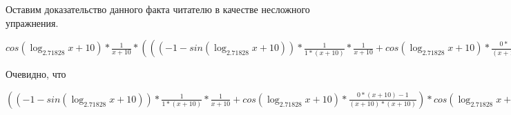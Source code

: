 \documentclass[12pt,a4paper,fleqn]{article}
\theoremstyle{definition}
\begin{document}
Оставим доказательство данного факта читателю в качестве несложного упражнения. 

$cos(\log_{ 2.71828 }{ x  +  10 }) * \frac{ 1 }{ x  +  10 }
 * ((( -1  - sin(\log_{ 2.71828 }{ x  +  10 })) * \frac{ 1 }{ 1  * ( x  +  10 )}
 * \frac{ 1 }{ x  +  10 }
 + cos(\log_{ 2.71828 }{ x  +  10 }) * \frac{ 0  * ( x  +  10 ) -  1 }{( x  +  10 ) * ( x  +  10 )}
) * { 3 }^{sin(\log_{ 2.71828 }{ x  +  10 })} + cos(\log_{ 2.71828 }{ x  +  10 }) * \frac{ 1 }{ x  +  10 }
 *  1  * cos(\log_{ 2.71828 }{ x  +  10 }) * \frac{ 1 }{ 1  * ( x  +  10 )}
 * { 3 }^{sin(\log_{ 2.71828 }{ x  +  10 })}) = cos(\log_{ 2.71828 }{ x  +  10 }) * \frac{ 1 }{ x  +  10 }
 * ((( -1  - sin(\log_{ 2.71828 }{ x  +  10 })) * \frac{ 1 }{ 1  * ( x  +  10 )}
 * \frac{ 1 }{ x  +  10 }
 + cos(\log_{ 2.71828 }{ x  +  10 }) * \frac{ 0  * ( x  +  10 ) -  1 }{( x  +  10 ) * ( x  +  10 )}
) * { 3 }^{sin(\log_{ 2.71828 }{ x  +  10 })} + cos(\log_{ 2.71828 }{ x  +  10 }) * \frac{ 1 }{ x  +  10 }
 *  1  * cos(\log_{ 2.71828 }{ x  +  10 }) * \frac{ 1 }{ 1  * ( x  +  10 )}
 * { 3 }^{sin(\log_{ 2.71828 }{ x  +  10 })})$

Очевидно, что 

$(( -1  - sin(\log_{ 2.71828 }{ x  +  10 })) * \frac{ 1 }{ 1  * ( x  +  10 )}
 * \frac{ 1 }{ x  +  10 }
 + cos(\log_{ 2.71828 }{ x  +  10 }) * \frac{ 0  * ( x  +  10 ) -  1 }{( x  +  10 ) * ( x  +  10 )}
) * cos(\log_{ 2.71828 }{ x  +  10 }) * \frac{ 1 }{ x  +  10 }
 * { 3 }^{sin(\log_{ 2.71828 }{ x  +  10 })} + cos(\log_{ 2.71828 }{ x  +  10 }) * \frac{ 1 }{ x  +  10 }
 * ((( -1  - sin(\log_{ 2.71828 }{ x  +  10 })) * \frac{ 1 }{ 1  * ( x  +  10 )}
 * \frac{ 1 }{ x  +  10 }
 + cos(\log_{ 2.71828 }{ x  +  10 }) * \frac{ 0  * ( x  +  10 ) -  1 }{( x  +  10 ) * ( x  +  10 )}
) * { 3 }^{sin(\log_{ 2.71828 }{ x  +  10 })} + cos(\log_{ 2.71828 }{ x  +  10 }) * \frac{ 1 }{ x  +  10 }
 *  1  * cos(\log_{ 2.71828 }{ x  +  10 }) * \frac{ 1 }{ 1  * ( x  +  10 )}
 * { 3 }^{sin(\log_{ 2.71828 }{ x  +  10 })}) = (( -1  - sin(\log_{ 2.71828 }{ x  +  10 })) * \frac{ 1 }{ 1  * ( x  +  10 )}
 * \frac{ 1 }{ x  +  10 }
 + cos(\log_{ 2.71828 }{ x  +  10 }) * \frac{ 0  * ( x  +  10 ) -  1 }{( x  +  10 ) * ( x  +  10 )}
) * cos(\log_{ 2.71828 }{ x  +  10 }) * \frac{ 1 }{ x  +  10 }
 * { 3 }^{sin(\log_{ 2.71828 }{ x  +  10 })} + cos(\log_{ 2.71828 }{ x  +  10 }) * \frac{ 1 }{ x  +  10 }
 * ((( -1  - sin(\log_{ 2.71828 }{ x  +  10 })) * \frac{ 1 }{ 1  * ( x  +  10 )}
 * \frac{ 1 }{ x  +  10 }
 + cos(\log_{ 2.71828 }{ x  +  10 }) * \frac{ 0  * ( x  +  10 ) -  1 }{( x  +  10 ) * ( x  +  10 )}
) * { 3 }^{sin(\log_{ 2.71828 }{ x  +  10 })} + cos(\log_{ 2.71828 }{ x  +  10 }) * \frac{ 1 }{ x  +  10 }
 *  1  * cos(\log_{ 2.71828 }{ x  +  10 }) * \frac{ 1 }{ 1  * ( x  +  10 )}
 * { 3 }^{sin(\log_{ 2.71828 }{ x  +  10 })})$
\end{document}
